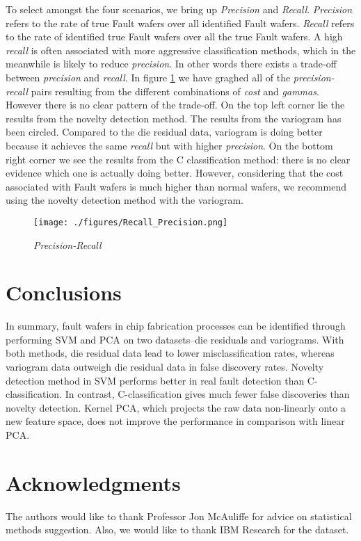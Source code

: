 \documentclass[english]{article}
\numberwithin{equation}{section}
\numberwithin{table}{section}
\numberwithin{figure}{section}
\begin{document}
To select amongst the four scenarios, we bring up \emph{Precision}
and \emph{Recall}. \emph{Precision} refers to the rate of true Fault
wafers over all identified Fault wafers. \emph{Recall} refers to the
rate of identified true Fault wafers over all the true Fault wafers.
A high \emph{recall} is often associated with more aggressive classification
methods, which in the meanwhile is likely to reduce \emph{precision}.
In other words there exists a trade-off between \emph{precision} and
\emph{recall}. In figure \ref{hh3} we have graghed all of the \emph{precision-recall}
pairs resulting from the different combinations of \emph{cost} and
\emph{gammas}. However there is no clear pattern of the trade-off.
On the top left corner lie the results from the novelty detection
method. The results from the variogram has been circled. Compared
to the die residual data, variogram is doing better because it achieves
the same \emph{recall} but with higher \emph{precision}. On the bottom
right corner we see the results from the C classification method:
there is no clear evidence which one is actually doing better. However,
considering that the cost associated with Fault wafers is much higher
than normal wafers, we recommend using the novelty detection method
with the variogram.


\begin{figure}
\begin{centering}
\texttt{[image: ./figures/Recall\_Precision.png]}
\par\end{centering}
\caption{\emph{Precision-Recall}}\label{hh3}
\end{figure}



\section{Conclusions} \label{summary}
\hspace{12 pt}
In summary, fault wafers in chip fabrication processes can be identified
through performing SVM and PCA on two datasets--die residuals and
variograms. With both methods, die residual data lead to lower misclassification
rates, whereas variogram data outweigh die residual data in false
discovery rates. Novelty detection method in SVM performs better in
real fault detection than C-classification. In contrast, C-classification
gives much fewer false discoveries than novelty detection. Kernel
PCA, which projects the raw data non-linearly onto a new feature space,
does not improve the performance in comparison with linear PCA.


\section*{Acknowledgments}
\hspace{12 pt}
The authors would like to thank Professor Jon McAuliffe for advice on
statistical methods suggestion. Also, we would like to thank IBM
Research for the dataset.





\end{document}
